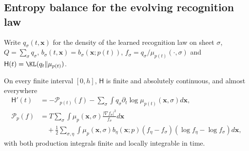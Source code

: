 \subsection{Entropy balance for the evolving recognition law}\label{app:sel_entropy}

Write $q_\sigma(t,\mathbf x)$ for the density of the learned recognition law on sheet $\sigma$, $Q=\sum_\sigma q_\sigma$, $b_\sigma(t,\mathbf x)=b_\sigma(\mathbf x;p(t))$, $f_\sigma=q_\sigma/\mu_{p(t)}(\cdot,\sigma)$ and $\mathsf H(t)=\KL(q_t\Vert\mu_{p(t)})$.

\begin{lemma}\label{lem:sel_entropy}
On every finite interval $[0,h]$, $\mathsf H$ is finite and absolutely continuous, and almost everywhere
\begin{equation}
\begin{aligned}
\mathsf H'(t)&=-\mathcal P_{p(t)}(f)-\sum_\sigma\int q_\sigma\partial_t\log\mu_{p(t)}(\mathbf x,\sigma)d\mathbf x,\\
\mathcal P_p(f)&=T\sum_\sigma\int\mu_p(\mathbf x,\sigma)\frac{|\nabla f_\sigma|^2}{f_\sigma}d\mathbf x\\
&\quad+\frac12\sum_{\sigma,\eta}\int\mu_p(\mathbf x,\sigma)b_\eta(\mathbf x;p)(f_\eta-f_\sigma)(\log f_\eta-\log f_\sigma)d\mathbf x,
\end{aligned}
\label{eq:sel_entropy_identity}
\end{equation}
with both production integrals finite and locally integrable in time.
\end{lemma}

